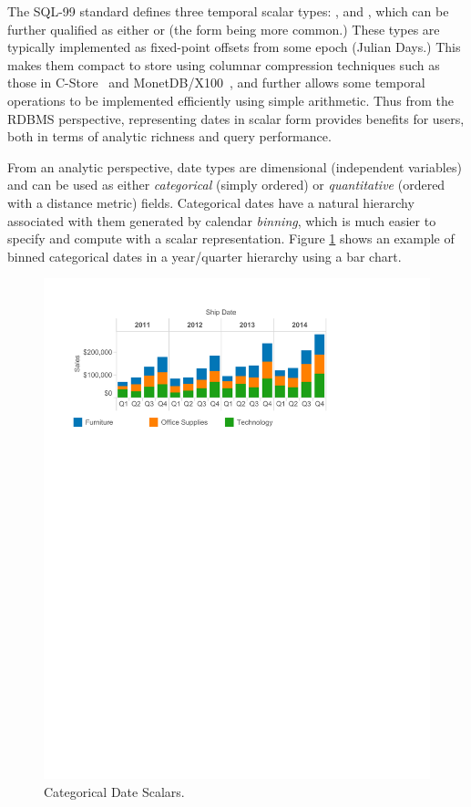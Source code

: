 The SQL-99 standard defines three temporal scalar types: ,  and , 
which can be further qualified as either  or   (the  form being more common.) 
These types are typically implemented as fixed-point offsets from some epoch (\eg Julian Days.) 
This makes them compact to store using columnar compression techniques such as those in C-Store~\cite{Stonebraker:2005} and MonetDB/X100~\cite{Zukowski:2006}, 
and further allows some temporal operations to be implemented efficiently using simple arithmetic. 
Thus from the RDBMS perspective, representing dates in scalar form provides benefits for users, both in terms of analytic richness and query performance.

From an analytic perspective, date types are dimensional (\ie independent variables) and can be used as either \emph{categorical} (simply ordered) or \emph{quantitative} (ordered with a distance metric) fields.
Categorical dates have a natural hierarchy associated with them generated by calendar \emph{binning}, which is much easier to specify and compute with a scalar representation.
Figure \ref{fig:I1} shows an example of binned categorical dates in a year/quarter hierarchy using a bar chart.

\begin{figure}[ht]
\centering
\includegraphics[width=\columnwidth]{figures/FigureI1}
\caption{Categorical Date Scalars.}
\label{fig:I1}
\end{figure}

